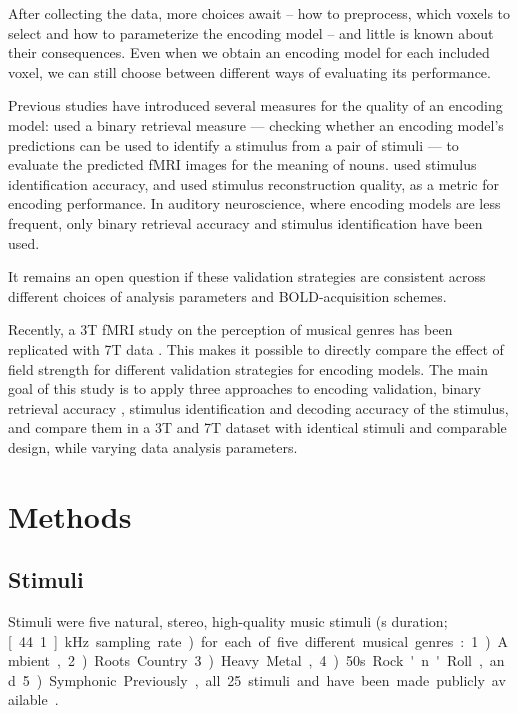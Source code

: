 After collecting the data, more choices await -- how to preprocess, which
voxels to select and how to parameterize the encoding model -- and little is known about their
consequences. Even when we obtain an encoding model for each included voxel,
we can still choose between different ways of evaluating its performance.

Previous studies have introduced several measures for the quality of
an encoding model: \citet{ML08} used a binary retrieval measure --- checking
whether an encoding model's predictions can be used to identify a stimulus from
a pair of stimuli --- to evaluate the predicted f{MRI} images for the meaning
of nouns. \citet{KG+08} used stimulus identification accuracy, and \citet{NG09} used
stimulus reconstruction quality, as a metric for encoding performance. In auditory
neuroscience, where encoding models are less frequent, only binary retrieval
accuracy \citep{CTK+2012} and stimulus identification \citep{SF14} have been
used. 

It remains an open question if these validation strategies are consistent
across different choices of analysis parameters and BOLD-acquisition schemes.

Recently, a 3T f{MRI} study on the perception of musical genres
\citep{CTK+2012} has been replicated with 7T data \citep{HDH+2015}. This makes
it possible to directly compare the effect of field strength for different 
validation strategies for encoding models. The main goal of this
study is to apply three approaches to encoding validation, binary retrieval
accuracy \citep{ML08}, stimulus identification \citep{KG+08,SF14} and
decoding accuracy of the stimulus, and compare them in a 3T
and 7T dataset with identical stimuli and comparable design, while varying
data analysis parameters.

\section*{Methods}

\subsection*{Stimuli}

Stimuli were five natural, stereo, high-quality music stimuli (\unit[6]{s}
duration; \unit[44.1]{kHz} sampling rate) for each of five different musical
genres: 1) Ambient, 2) Roots Country 3) Heavy Metal, 4) 50s Rock'n'Roll, and 5)
Symphonic. Previously, all 25 stimuli and have been made publicly available
\citep{HDH+2015}.

